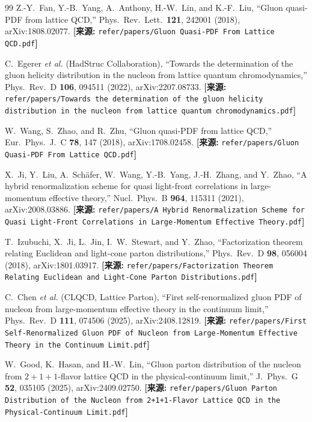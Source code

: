 \documentclass[12pt,a4paper]{ctexart}
\theoremstyle{definition}
\begin{document}
\begin{thebibliography}{99}
Z.-Y.~Fan, Y.-B.~Yang, A.~Anthony, H.-W.~Lin, and K.-F.~Liu,
``Gluon quasi-PDF from lattice QCD,''
Phys.\ Rev.\ Lett.\ \textbf{121}, 242001 (2018), arXiv:1808.02077.
\quad\textbf{[来源:} \texttt{refer/papers/Gluon Quasi-PDF From Lattice QCD.pdf}\textbf{]}

C.~Egerer \textit{et al.} (HadStruc Collaboration),
``Towards the determination of the gluon helicity distribution in the nucleon from lattice quantum chromodynamics,''
Phys.\ Rev.\ D \textbf{106}, 094511 (2022), arXiv:2207.08733.
\quad\textbf{[来源:} \texttt{refer/papers/Towards the determination of the gluon helicity distribution in the nucleon from lattice quantum chromodynamics.pdf}\textbf{]}

W.~Wang, S.~Zhao, and R.~Zhu,
``Gluon quasi-PDF from lattice QCD,''
Eur.\ Phys.\ J.\ C \textbf{78}, 147 (2018), arXiv:1708.02458.
\quad\textbf{[来源:} \texttt{refer/papers/Gluon Quasi-PDF From Lattice QCD.pdf}\textbf{]}

X.~Ji, Y.~Liu, A.~Sch\"afer, W.~Wang, Y.-B.~Yang, J.-H.~Zhang, and Y.~Zhao,
``A hybrid renormalization scheme for quasi light-front correlations in large-momentum effective theory,''
Nucl.\ Phys.\ B \textbf{964}, 115311 (2021), arXiv:2008.03886.
\quad\textbf{[来源:} \texttt{refer/papers/A Hybrid Renormalization Scheme for Quasi Light-Front Correlations in Large-Momentum Effective Theory.pdf}\textbf{]}

T.~Izubuchi, X.~Ji, L.~Jin, I.~W.~Stewart, and Y.~Zhao,
``Factorization theorem relating Euclidean and light-cone parton distributions,''
Phys.\ Rev.\ D \textbf{98}, 056004 (2018), arXiv:1801.03917.
\quad\textbf{[来源:} \texttt{refer/papers/Factorization Theorem Relating Euclidean and Light-Cone Parton Distributions.pdf}\textbf{]}

C.~Chen \textit{et al.} (CLQCD, Lattice Parton),
``First self-renormalized gluon PDF of nucleon from large-momentum effective theory in the continuum limit,''
Phys.\ Rev.\ D \textbf{111}, 074506 (2025), arXiv:2408.12819.
\quad\textbf{[来源:} \texttt{refer/papers/First Self-Renormalized Gluon PDF of Nucleon from Large-Momentum Effective Theory in the Continuum Limit.pdf}\textbf{]}

W.~Good, K.~Hasan, and H.-W.~Lin,
``Gluon parton distribution of the nucleon from $2+1+1$-flavor lattice QCD in the physical-continuum limit,''
J.\ Phys.\ G \textbf{52}, 035105 (2025), arXiv:2409.02750.
\quad\textbf{[来源:} \texttt{refer/papers/Gluon Parton Distribution of the Nucleon from 2+1+1-Flavor Lattice QCD in the Physical-Continuum Limit.pdf}\textbf{]}


\end{thebibliography}
\end{document}
